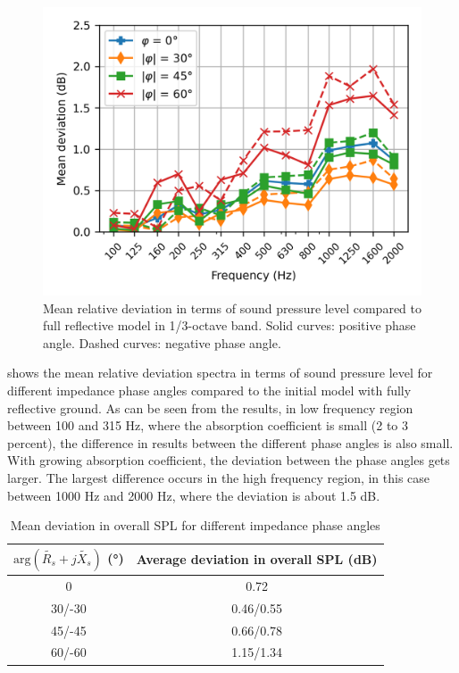 \begin{figure}[H]
	\centering
	\includegraphics[width=0.7\linewidth]{fig/chap5/impedance/freq_spectrum/average_gap.png}
	\caption{Mean relative deviation in terms of sound pressure level compared to full reflective model in 1/3-octave band. Solid curves: positive phase angle. Dashed curves: negative phase angle.}
	\label{fig:gap_freq_spectrum_impedance}
\end{figure}

\noindent{} shows the mean relative deviation spectra in terms of sound pressure level for different impedance phase angles compared to the initial model with fully reflective ground. As can be seen from the results, in low frequency region between 100 and 315 Hz, where the absorption coefficient is small (2 to 3 percent), the difference in results between the different phase angles is also small. With growing absorption coefficient, the deviation between the phase angles gets larger. The largest difference occurs in the high frequency region, in this case between 1000 Hz and 2000 Hz, where the deviation is about 1.5 dB.

\begin{table}[H]
	\centering
	\caption{Mean deviation in overall SPL for different impedance phase angles}
	\label{tab:mean_devaition_impedance}
	\begin{tabular}{cc}
		\toprule
		$\text{arg}(\tilde{R_s} + j\tilde{X_s})$ (°) & Average deviation in overall SPL (dB) \\
		\midrule
		0                         & 0.72                                      \\
		30/-30                    & 0.46/0.55                                 \\
		45/-45                    & 0.66/0.78                                 \\
		60/-60                    & 1.15/1.34                                 \\
		\bottomrule
	\end{tabular}
\end{table}

